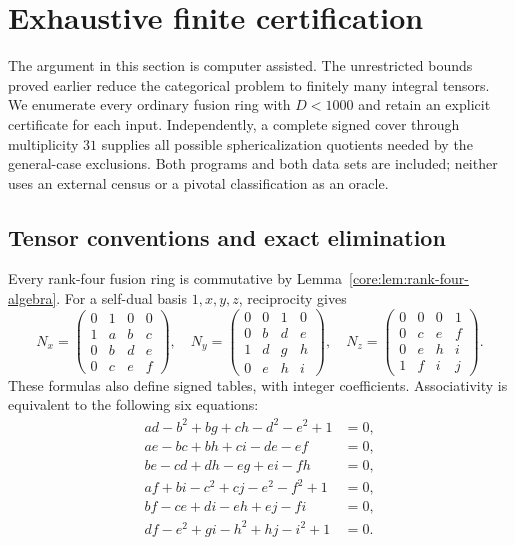 \section{Exhaustive finite certification}\label{finite:sec:catalog}
The argument in this section is computer assisted.  The unrestricted
bounds proved earlier reduce the categorical problem to finitely many
integral tensors. We enumerate every ordinary fusion ring with $D<1000$
and retain an explicit certificate for each input. Independently, a complete
signed cover through multiplicity $31$ supplies all possible sphericalization
quotients needed by the general-case exclusions. Both programs and both data
sets are included; neither uses an external census or a pivotal classification
as an oracle.

\subsection{Tensor conventions and exact elimination}\label{finite:sec:census}
Every rank-four fusion ring is commutative by
Lemma~\ref{core:lem:rank-four-algebra}.
For a self-dual basis $1,x,y,z$, reciprocity gives
\[
N_x=\begin{pmatrix}0&1&0&0\\1&a&b&c\\0&b&d&e\\0&c&e&f\end{pmatrix},\quad
N_y=\begin{pmatrix}0&0&1&0\\0&b&d&e\\1&d&g&h\\0&e&h&i\end{pmatrix},\quad
N_z=\begin{pmatrix}0&0&0&1\\0&c&e&f\\0&e&h&i\\1&f&i&j\end{pmatrix}.
\]
These formulas also define signed tables, with integer coefficients.
Associativity is equivalent to the following six equations:
\begin{align}
 ad-b^2+bg+ch-d^2-e^2+1&=0,\label{finite:eq:census1}\\
 ae-bc+bh+ci-de-ef&=0,\label{finite:eq:census2}\\
 be-cd+dh-eg+ei-fh&=0,\label{finite:eq:census3}\\
 af+bi-c^2+cj-e^2-f^2+1&=0,\label{finite:eq:census4}\\
 bf-ce+di-eh+ej-fi&=0,\label{finite:eq:census5}\\
 df-e^2+gi-h^2+hj-i^2+1&=0.\label{finite:eq:census6}
\end{align}

